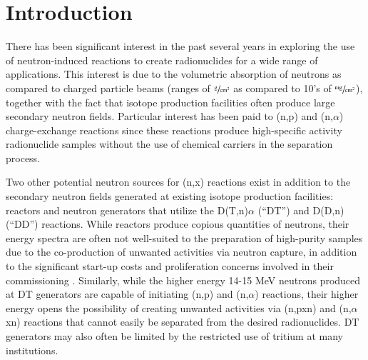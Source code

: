 \documentclass[5p]{elsarticle}
\begin{document}



\section{Introduction} \label{sec:intro}

%
%
%

There has been significant interest in the past several years in exploring the use of neutron-induced reactions to create radionuclides for a wide range of applications.
This interest is due to the volumetric absorption of neutrons as compared to charged particle beams (ranges of $\sfrac{\text{g}}{\text{cm}^2}$ as compared to 10's of $\sfrac{\text{mg}}{\text{cm}^2}$), together with the fact that isotope production facilities often produce large secondary neutron fields.
 Particular interest has been paid to (n,p) and (n,$\alpha$) charge-exchange reactions since these reactions produce high-specific activity radionuclide samples without the use of chemical carriers in the separation process.
 

Two other potential neutron sources for (n,x) reactions exist in addition to the secondary neutron fields generated at existing isotope production facilities: reactors and neutron generators that utilize the D(T,n)$\alpha$ (\enquote{DT}) and D(D,n) (\enquote{DD}) reactions.
 While reactors produce copious quantities of neutrons, their energy spectra are often not well-suited to the preparation of high-purity samples due to the co-production of unwanted activities via neutron capture, in addition to the significant start-up costs and proliferation concerns involved in their commissioning \cite{Updegraff2013}.
 Similarly, while the higher energy 14-15 MeV neutrons produced at DT generators are capable of initiating (n,p) and (n,$\alpha$) reactions, their higher energy opens the possibility of creating unwanted activities via (n,pxn) and (n,$\alpha$xn) reactions that cannot easily be separated from the desired radionuclides. DT generators may also often be limited by the restricted use of tritium at many institutions.
\end{document}
